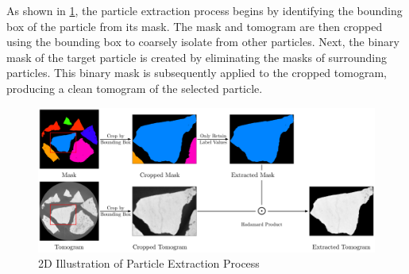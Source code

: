 \documentclass[preprint,12pt]{elsarticle}
\begin{document}
As shown in \cref{fig:extract_particles}, the particle extraction process begins by identifying the bounding box of the particle from its mask. 
The mask and tomogram are then cropped using the bounding box to coarsely isolate from other particles.
Next, the binary mask of the target particle is created by eliminating the masks of surrounding particles.
This binary mask is subsequently applied to the cropped tomogram, producing a clean tomogram of the selected particle.

\begin{figure}
    \includegraphics[width=\textwidth]{figures/pdf/particle-extraction.pdf}
    \caption{2D Illustration of Particle Extraction Process} \label{fig:extract_particles}
\end{figure}
\end{document}

